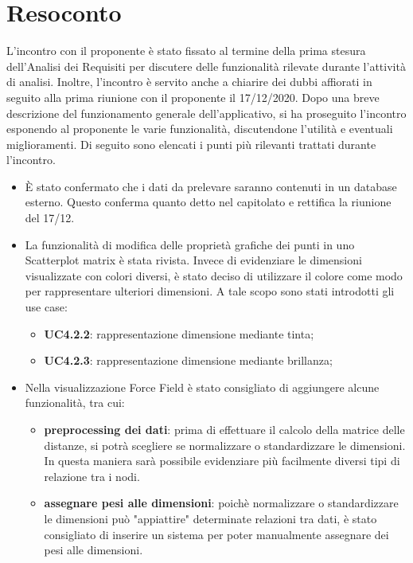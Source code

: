 \documentclass{article}
\begin{document}
\section{Resoconto}
\label{sec:resoconto}

	L'incontro con il proponente è stato fissato al termine della prima stesura dell'Analisi dei Requisiti per discutere delle funzionalità  rilevate durante l'attività di analisi.
	Inoltre, l'incontro è servito anche a chiarire dei dubbi affiorati in seguito alla prima riunione con il proponente il 17/12/2020.
	Dopo una breve descrizione del funzionamento generale dell'applicativo, si ha proseguito l'incontro esponendo al proponente le varie funzionalità, discutendone l'utilità e eventuali miglioramenti.
	Di seguito sono elencati i punti più rilevanti trattati durante l'incontro.
	\begin{itemize}
	    \item È stato confermato che i dati da prelevare saranno contenuti in un database esterno. Questo conferma quanto detto nel capitolato e rettifica la riunione del 17/12.
		\item La funzionalità di modifica delle proprietà grafiche dei punti in uno Scatterplot matrix è stata rivista. Invece di evidenziare le dimensioni visualizzate con colori diversi, è stato deciso di utilizzare il colore come modo per rappresentare ulteriori dimensioni. A tale scopo sono stati introdotti gli use case:
		\begin {itemize}
			\item \textbf{UC4.2.2}: rappresentazione dimensione mediante tinta;
			\item \textbf{UC4.2.3}: rappresentazione dimensione mediante brillanza;
		\end{itemize}
		\item Nella visualizzazione Force Field è stato consigliato di aggiungere alcune funzionalità, tra cui:
		\begin {itemize}
		 	\item \textbf{preprocessing dei dati}: prima di effettuare il calcolo della matrice delle distanze, si potrà scegliere se normalizzare o standardizzare le dimensioni. In questa maniera sarà possibile evidenziare più facilmente diversi tipi di relazione tra i nodi.
			\item \textbf{assegnare pesi alle dimensioni}: poichè normalizzare o standardizzare le dimensioni può "appiattire" determinate relazioni tra dati, è stato consigliato di inserire un sistema per poter manualmente assegnare dei pesi alle dimensioni.

\end{itemize}
\end{itemize}
\end{document}
